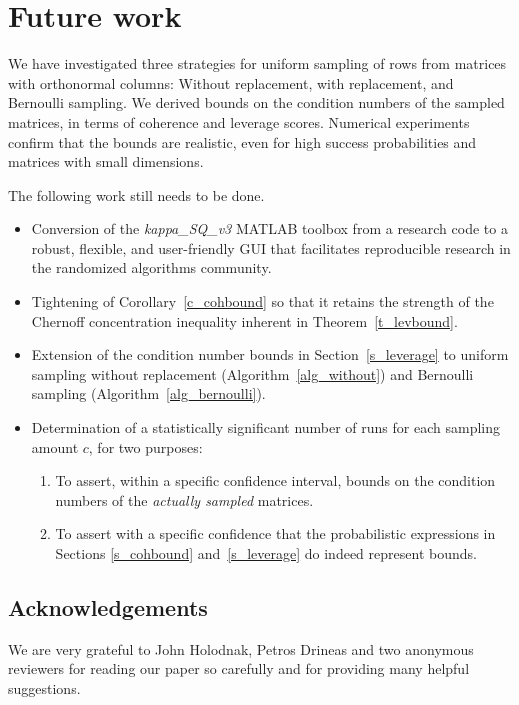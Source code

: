 \documentclass{siamltex}
\begin{document}
 

\section{Future work}\label{s_future}
We have investigated three strategies for uniform sampling of rows from matrices 
with orthonormal columns: Without replacement, with replacement, and Bernoulli
sampling. We derived bounds on the condition numbers of the sampled
matrices, in terms of coherence and leverage scores. Numerical
experiments confirm that the bounds are realistic, even for 
high success probabilities and
matrices with small dimensions.

The following work still needs to be done.

\begin{itemize}
\item Conversion of the \textsl{kappa\_SQ\_v3} MATLAB toolbox
from a research code to a 
robust, flexible, and user-friendly GUI that facilitates 
reproducible research in the randomized algorithms community.

\item Tightening of Corollary~\ref{c_cohbound} so that it retains the 
strength of the Chernoff concentration inequality 
inherent in Theorem~\ref{t_levbound}.

\item Extension of the condition number bounds in Section~\ref{s_leverage} to 
 uniform sampling without replacement 
(Algorithm~\ref{alg_without}) and Bernoulli sampling 
(Algorithm~\ref{alg_bernoulli}). 

\item  Determination of a statistically significant number of runs
for each sampling amount $c$, for two purposes:
\begin{enumerate}
\item To assert, within a specific confidence interval, bounds on the 
condition numbers of the \textit{actually sampled} matrices.
\item To assert with a specific confidence that the probabilistic
expressions in Sections \ref{s_cohbound} and~\ref{s_leverage} 
do indeed represent bounds.
\end{enumerate}
\end{itemize}

\subsection*{Acknowledgements}
We are very grateful to John Holodnak, Petros Drineas and two anonymous
reviewers for reading our paper so 
carefully and for providing many helpful suggestions.
\end{document}
